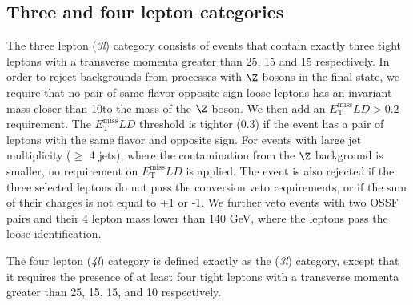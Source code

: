 \subsection{Three and four lepton categories}
The three lepton (\textit{3l}) category consists of events that contain exactly three tight leptons with a transverse momenta greater than 25, 15 and 15 \GeV respectively. 
In order to reject backgrounds from processes with $\Z$ bosons in the final state, we require that no pair of same-flavor opposite-sign loose leptons has an invariant mass closer than 10\GeV to the mass of the $\Z$ boson. We then add an $E_\mathrm{T}^\mathrm{miss}LD > 0.2$ requirement.
The $E_\mathrm{T}^\mathrm{miss}LD$ threshold is tighter (0.3)
if the event has a pair of leptons with the same flavor and opposite sign. 
For events with large jet multiplicity ($\geq$ 4 jets), where the contamination
from the $\Z$ background is smaller, no requirement
on $E_\mathrm{T}^\mathrm{miss}LD$ is applied.
The event is also rejected if the three selected leptons do not pass the conversion veto requirements, or if the sum of their charges is not equal to +1 or -1.
We further veto events with two OSSF pairs and their 4 lepton mass lower than 140 GeV, where the leptons pass the loose identification.

The four lepton (\textit{4l}) category is defined exactly as the (\textit{3l}) category, except that it requires the presence of 
at least four tight leptons with a transverse momenta greater than 25, 15, 15, and 10 \GeV respectively.


